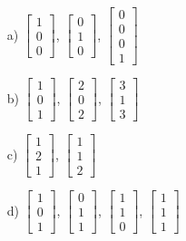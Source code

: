 \documentclass{article}
\begin{document}
\begin{itemize}
	\item[a) ] $ \begin{bmatrix} 1 \\ 0 \\ 0 \end{bmatrix}$, $\begin{bmatrix} 0 \\ 1 \\ 0 \end{bmatrix}$, $\begin{bmatrix} 0 \\ 0 \\ 0 \\ 1 \end{bmatrix}$
	\item[b) ] $ \begin{bmatrix} 1 \\ 0 \\ 1 \end{bmatrix}$, $\begin{bmatrix} 2 \\ 0 \\ 2 \end{bmatrix}$, $\begin{bmatrix} 3 \\ 1 \\ 3 \end{bmatrix}$
	\item[c) ] $ \begin{bmatrix} 1 \\ 2 \\ 1 \end{bmatrix}$, $\begin{bmatrix} 1 \\ 1 \\ 2 \end{bmatrix}$
	\item[d) ] $ \begin{bmatrix} 1 \\ 0 \\ 1 \end{bmatrix}$, $\begin{bmatrix} 0 \\ 1 \\ 1 \end{bmatrix}$, $\begin{bmatrix} 1 \\ 1 \\ 0 \end{bmatrix}$, $\begin{bmatrix} 1 \\ 1 \\ 1 \end{bmatrix}$

\end{itemize}
\end{document}
